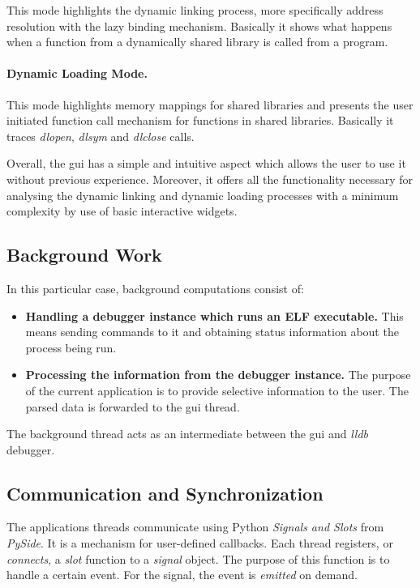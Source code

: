 This mode highlights the dynamic linking process, more specifically address resolution with the lazy binding mechanism. Basically it shows what happens when a function from a dynamically shared library is called from a program.

\paragraph{Dynamic Loading Mode.}

This mode highlights memory mappings for shared libraries and presents the user initiated function call mechanism for functions in shared libraries. Basically it traces \textit{dlopen}, \textit{dlsym} and \textit{dlclose} calls.

Overall, the gui has a simple and intuitive aspect which allows the user to use it without previous experience. Moreover, it offers all the functionality necessary for analysing the dynamic linking and dynamic loading processes with a minimum complexity by use of basic interactive widgets.

\subsection{Background Work}

In this particular case, background computations consist of:
\begin{itemize}
\item \textbf{Handling a debugger instance which runs an ELF executable.} This means sending commands to it and obtaining status information about the process being run.
\item \textbf{Processing the information from the debugger instance.} The purpose of the current application is to provide selective information to the user. The parsed data is forwarded to the gui thread.
\end{itemize}

The background thread acts as an intermediate between the gui and \textit{lldb} debugger.

\subsection{Communication and Synchronization}

The applications threads communicate using Python \textit{Signals and Slots} from \textit{PySide}. It is a mechanism for user-defined callbacks. Each thread registers, or \textit{connects}, a \textit{slot} function to a \textit{signal} object. The purpose of this function is to handle a certain event. For the signal, the event is \textit{emitted} on demand.

